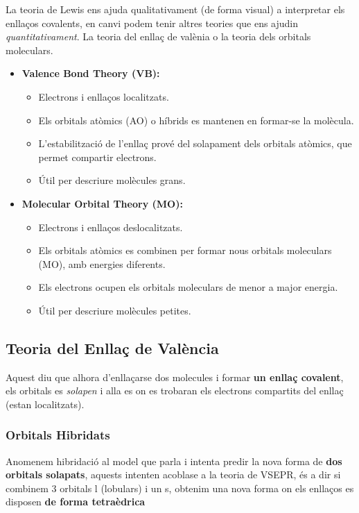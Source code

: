 \documentclass[12pt]{article}
\begin{document}
La teoria de Lewis ens ajuda qualitativament (de forma visual) a interpretar els enllaços covalents, en canvi podem tenir altres teories que ens ajudin \textit{quantitativament}. La teoria del enllaç de valènia o la teoria dels orbitals moleculars.

\begin{itemize}
    \item \textbf{Valence Bond Theory (VB):}
    \begin{itemize}
        \item Electrons i enllaços localitzats.
        \item Els orbitals atòmics (AO) o híbrids es mantenen en formar-se la molècula.
        \item L'estabilització de l'enllaç prové del solapament dels orbitals atòmics, que permet compartir electrons.
        \item Útil per descriure molècules grans.
    \end{itemize}

    \item \textbf{Molecular Orbital Theory (MO):}
    \begin{itemize}
        \item Electrons i enllaços deslocalitzats.
        \item Els orbitals atòmics es combinen per formar nous orbitals moleculars (MO), amb energies diferents.
        \item Els electrons ocupen els orbitals moleculars de menor a major energia.
        \item Útil per descriure molècules petites.
    \end{itemize}
\end{itemize}

\subsection{Teoria del Enllaç de València}

Aquest diu que alhora d'enllaçarse dos molecules i formar \textbf{un enllaç covalent}, els orbitals es \textit{solapen} i alla es on es trobaran els electrons compartits del enllaç (estan localitzats).

\subsubsection{Orbitals Hibridats}

Anomenem hibridació al model que parla i intenta predir la nova forma de \textbf{dos orbitals solapats}, aquests intenten acoblase a la teoria de VSEPR, és a dir si combinem 3 orbitals l (lobulars) i un s, obtenim una nova forma on els enllaços es disposen \textbf{de forma tetraèdrica}
\end{document}

